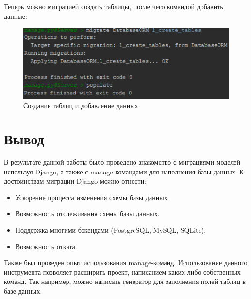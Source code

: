 \documentclass[14pt,a4paper,report]{report}
\begin{document}


Теперь можно миграцией создать таблицы, после чего командой  добавить данные:

\begin{figure}[h!]
	\centering
	\includegraphics[scale = 0.80]{images/9.png}
	\caption{Создание таблиц и добавление данных}
	\label{image:9}
\end{figure}

\section{Вывод}

В результате данной работы было проведено знакомство с миграциями моделей используя Django, а также с manage-командами для наполнения базы данных. К достоинствам миграции Django можно отнести:

\begin{itemize}
	\item Ускорение процесса изменения схемы базы данных.
	\item Возможность отслеживания схемы базы данных.
	\item Поддержка многими бэкендами (PostgreSQL, MySQL, SQLite).
	\item Возможность отката.
\end{itemize}

Также был проведен опыт использования manage-команд. Использование данного инструмента позволяет расширить проект, написанием каких-либо собственных команд. Так например, можно написать генератор для заполнения полей таблиц в базе данных.
\end{document}
